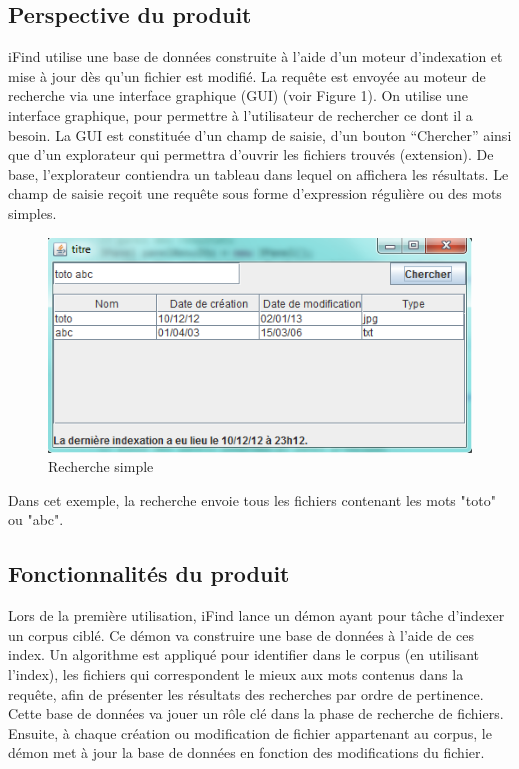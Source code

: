 \documentclass[a4paper,10pt]{article}
\begin{document}
\subsection{Perspective du produit}
iFind utilise une base de données construite à l'aide d'un moteur d'indexation
et mise à jour dès qu'un fichier est modifié. La requête est envoyée au moteur
de recherche via une interface graphique (GUI) (voir Figure 1). On utilise une
interface graphique, pour permettre à l’utilisateur de rechercher ce dont il a
besoin. La GUI est constituée d’un champ de saisie, d’un bouton “Chercher” ainsi
que d’un explorateur qui permettra d’ouvrir les fichiers trouvés (extension). De
base, l’explorateur contiendra un tableau dans lequel on affichera les
résultats. Le champ de saisie reçoit une requête sous forme d’expression
régulière ou des mots simples.

\begin{figure}
\center
\includegraphics[scale=0.7]{rechercheSimple.png}
\caption{Recherche simple}
\end{figure}

Dans cet exemple, la recherche envoie tous les fichiers contenant les mots
"toto" ou "abc".


\subsection{Fonctionnalités du produit}
Lors de la première utilisation, iFind lance un démon ayant pour tâche d’indexer
un corpus ciblé. 
Ce démon va construire une base de données à l’aide de ces index. Un algorithme
est appliqué pour identifier dans le corpus (en utilisant l'index), les fichiers
qui correspondent le mieux aux mots contenus dans la requête, afin de présenter
les résultats des recherches par ordre de pertinence. Cette base de données va
jouer un rôle clé dans la phase de recherche de fichiers.
Ensuite, à chaque création ou modification de fichier appartenant au corpus, le
démon met à jour la base de données en fonction des modifications du fichier.
\end{document}
